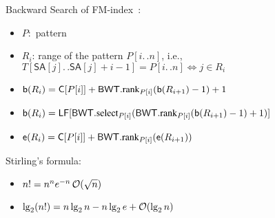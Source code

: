 \documentclass[10pt,landscape]{article}
\newcommand*{\UnaryOperator}[2][]{%
	\ifx&#1&%
	\ensuremath{\mathop{}\mathopen{}#2\mathopen{}}%
	\else%
	\ensuremath{\mathop{}\mathopen{}#2\mathopen{}\left(#1\right)}%
\fi%
}
\newcommand*{\Oh}[1]{\UnaryOperator[#1]{\mathcal{O}}}
\newcommand*{\IC}{\mathbin{{.}\,{.}}} %
\newcommand*{\instancename}[1]{\ensuremath{\mathsf{#1}}} %
\newcommand*{\SA}  {\instancename{SA}}
\newcommand*{\LF}  {\instancename{LF}}
\newcommand*{\BWT}  {\instancename{BWT}}
\newcommand*{\arrC}  {\instancename{C}}
\newcommand*{\textT}  {\ensuremath{T}}
\newcommand*{\ibeg}[1]{\mathsf{b}(#1)}%
\newcommand*{\iend}[1]{\mathsf{e}(#1)}%
\newcommand*{\functionname}[1]{{\ensuremath{\renewcommand{\rmdefault}{ptm}\fontfamily{ppl}\selectfont\textrm{\textup{#1}}}}} %
\newcommand*{\select}{\functionname{select}}
\newcommand*{\rank}{\functionname{rank}}
\begin{document}
\begin{multicols}{2}
Backward Search of FM-index~\cite{ferragina00fmindex}:
\begin{itemize}
	\item   $P:$ pattern
	\item   $R_i$: range of the pattern $P[i\IC{}n]$, i.e., $\textT[\SA[j]\IC{}\SA[j]+i-1] = P[i\IC{}n] \Leftrightarrow j \in R_i$
	\item $\ibeg{R_i} = \arrC[P[i]] + \BWT.\rank_{P[i]}(\ibeg{R_{i+1}}-1)+1$
        \item $\ibeg{R_i} = \LF[ \BWT.\select_{P[i]}( \BWT.\rank_{P[i]}(\ibeg{R_{i+1}}-1)+1)]$
	\item $\iend{R_i} = \arrC[P[i]] + \BWT.\rank_{P[i]}(\iend{R_{i+1}})$
\end{itemize}




Stirling's formula:
\begin{itemize}
   \item $n! = n^n e^{-n} \Oh{\sqrt{n}}$
   \item $\lg_{2} (n!) = n\lg_{2} n - n \lg_{2} e + \Oh{\lg_{2} n}$
\end{itemize}

\end{multicols}


\begin{multicols}{3}


\end{multicols}
\end{document}
